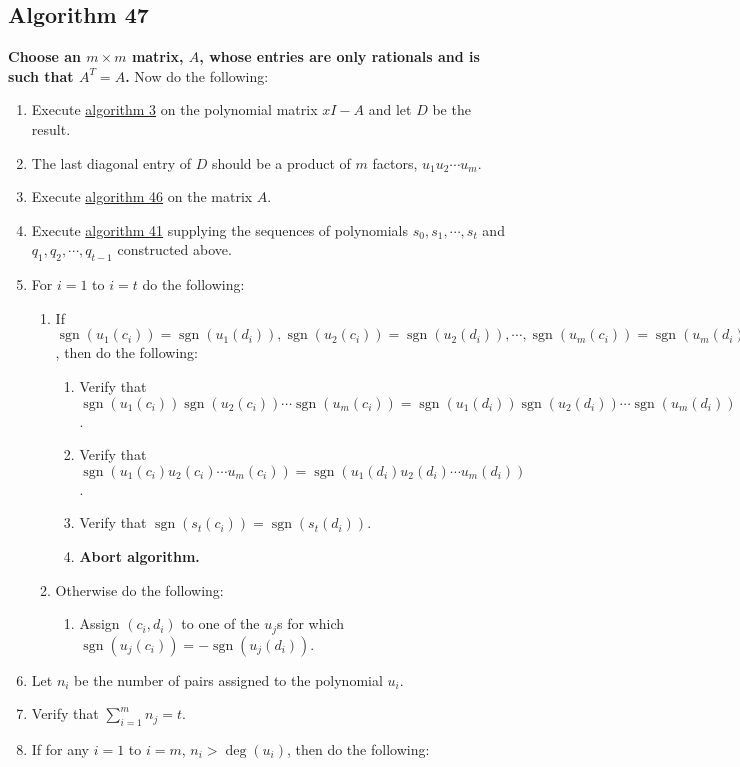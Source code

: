 \documentclass[twocolumn]{article}
\DeclareMathOperator{\sgn}{sgn}
\begin{document}
		\subsection{Algorithm 47}\label{sec:algorithm 47}
			\textbf{Choose an $m\times m$ matrix, $A$, whose entries are only rationals and is such that $A^T=A$.} Now do the following:
			\begin{enumerate}
				\item Execute \hyperref[sec:algorithm 3]{algorithm 3} on the polynomial matrix $xI-A$ and let $D$ be the result.
				\item The last diagonal entry of $D$ should be a product of $m$ factors, $u_1u_2\cdots u_m$.
				\item Execute \hyperref[sec:algorithm 46]{algorithm 46} on the matrix $A$.
				\item Execute \hyperref[sec:algorithm 41]{algorithm 41} supplying the sequences of polynomials $s_0,s_1,\cdots,s_t$ and $q_1,q_2,\cdots,q_{t-1}$ constructed above.
				\item For $i=1$ to $i=t$ do the following:
				\begin{enumerate}
					\item If $\sgn(u_1(c_i))=\sgn(u_1(d_i)), \sgn(u_2(c_i))=\sgn(u_2(d_i)), \cdots, \sgn(u_m(c_i))=\sgn(u_m(d_i))$, then do the following:
					\begin{enumerate}
						\item Verify that $\sgn(u_1(c_i))\sgn(u_2(c_i))\cdots\sgn(u_m(c_i))=\sgn(u_1(d_i))\sgn(u_2(d_i))\cdots\sgn(u_m(d_i))$.
						\item Verify that $\sgn(u_1(c_i)u_2(c_i)\cdots u_m(c_i))=\sgn(u_1(d_i)u_2(d_i)\cdots u_m(d_i))$.
						\item Verify that $\sgn(s_t(c_i))=\sgn(s_t(d_i))$.
						\item \textbf{Abort algorithm.}
					\end{enumerate}
					\item Otherwise do the following:
					\begin{enumerate}
						\item Assign $(c_i,d_i)$ to one of the $u_j$s for which $\sgn(u_j(c_i))=-\sgn(u_j(d_i))$.
					\end{enumerate}
				\end{enumerate}
				\item Let $n_i$ be the number of pairs assigned to the polynomial $u_i$.
				\item Verify that $\sum_{i=1}^m n_j=t$.
				\item If for any $i=1$ to $i=m$, $n_i>\deg(u_i)$, then do the following:

\end{enumerate}
\end{document}
